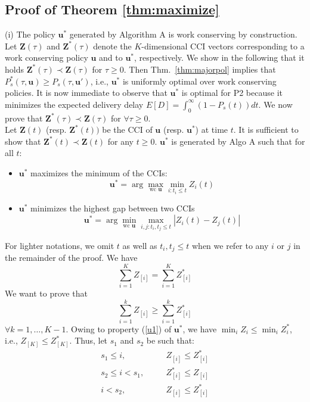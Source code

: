 \documentclass[10pt,twocolumn,conference,final]{IEEEtran}
\newcommand{\Z}{\mathbf Z}
\begin{document}
\subsection{\bf Proof of Theorem \ref{thm:maximize}}
(i) The policy $\mathbf u^*$ generated by Algorithm A is work conserving 
by construction. Let $\Z(\tau)$ and $\Z^*(\tau)$ denote the $K$-dimensional 
CCI vectors corresponding to a work conserving policy $\mathbf u$ and to $
\mathbf u^*$, respectively. We show in the following that it holds $\Z^*(\tau ) \prec \Z (\tau)$
 for $\tau\geq 0$. Then Thm.~\ref{thm:majorpol} implies that 
$P_s^*( \tau , {\mathbf u} ) \geq P_s(\tau ,{\mathbf u'})$, i.e., 
$\mathbf u^*$ is uniformly optimal over work conserving policies. It is now 
immediate to observe that $\mathbf{u}^*$ is optimal for P2 because it minimizes 
the expected delivery delay $E[D]=\int_0^\infty  (1-P_s(t)) dt$.
We now prove that $\Z^*(\tau ) \prec \Z (\tau)$ for $\forall \tau \geq 0$. \\
Let $\mathbf{Z}(t)$ (resp. $\mathbf{Z}^*(t))$ be the CCI of $\mathbf{u}$ (resp. $\mathbf{u}^*$) at time $t$. 
It is sufficient to show that $\mathbf{Z}^*(t)\prec \mathbf{Z}(t)$  for any $t\geq 0$.
$\mathbf{u}^*$ is generated by Algo A such that for all $t$:
\begin{itemize}
\item $\mathbf{u}^*$ maximizes the minimum of the CCIs:
\begin{equation}\label{u1}
\mathbf{u}^*=\arg\max_{\mbox{wc }\mathbf{u}} \min_{i:t_i\leq t}Z_i(t)
\end{equation}
\item $\mathbf{u}^*$ minimizes the highest gap between two CCIs
\begin{equation}\label{u2}
\mathbf{u}^*=\arg\min_{\mbox{wc }\mathbf{u}} \max_{i,j:t_i,t_j\leq t}|Z_i(t)-Z_j(t)|
\end{equation}
\end{itemize}
For lighter notations, we omit $t$ as well as $t_i,t_j\leq t$ when 
we refer to any $i$ or $j$ in the remainder of the proof.
We have 
\[\sum_{i=1}^K Z_{[i]}=\sum_{i=1}^K Z^*_{[i]}\]
We want to prove that 
\[\sum_{i=1}^k Z_{[i]}\geq \sum_{i=1}^k Z^*_{[i]}\]
$\forall k=1,\dots,K-1$.
Owing to property (\ref{u1}) of $\mathbf{u}^*$, we have $\min_i Z_i\leq\min_i Z^*_i$, i.e., $Z_{[K]}\leq Z^*_{[K]}$.
Thus, let $s_1$ and $s_2$ be such that:
\begin{eqnarray}
s_1\leq i,&\quad& Z_{[i]}\leq Z^*_{[i]}\nonumber\\
s_2\leq i< s_1,&\quad& Z^*_{[i]}\leq Z_{[i]}\nonumber\\
i<s_2,&\quad& Z_{[i]}\leq Z^*_{[i]}\nonumber
\end{eqnarray}
\end{document}
